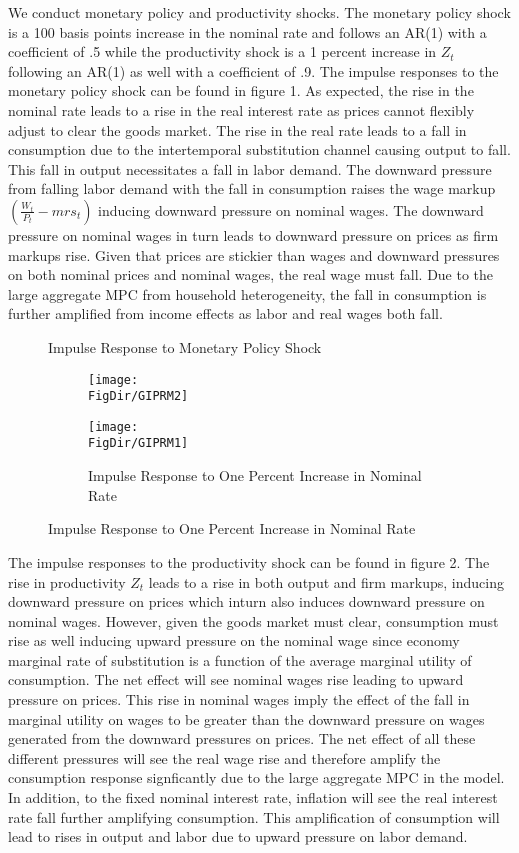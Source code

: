 \documentclass[titlepage]{\econtex}\providecommand{\texname}{BufferStockTheory}
\providecommand{\FigDir}{Figures}
\begin{document}
We conduct monetary policy and productivity shocks. The monetary policy shock is a 100 basis points increase in the nominal rate and follows an AR(1) with a coefficient of .5 while the productivity shock is a 1 percent increase in $Z_{t}$ following an AR(1) as well with a coefficient of .9. The impulse responses to the monetary policy shock can be found in figure 1.  As expected, the rise in the nominal rate leads to a rise in the real interest rate as prices cannot flexibly adjust to clear the goods market. The rise in the real rate leads to a fall in consumption due to the intertemporal substitution channel  causing output to fall. This fall in output necessitates a fall in labor demand. The downward pressure from falling labor demand with the fall in consumption raises the wage markup $(\frac{W_{t}}{P_{t}} - mrs_{t})$ inducing downward pressure on nominal wages. The downward pressure on nominal wages in turn leads to downward pressure on prices as firm markups rise. Given that prices are stickier than wages and downward pressures on both nominal prices and nominal wages, the real wage must fall. Due to the large aggregate MPC from household heterogeneity, the fall in consumption is further amplified from income effects as labor and real wages both fall. 


\begin{figure}{Impulse Response to Monetary Policy Shock}
  \begin{subfigure}{}
    \centering\texttt{[image: \\FigDir/GIPRM2]}
  \end{subfigure}
  \begin{subfigure}{}
    \centering\texttt{[image: \\FigDir/GIPRM1]}
    \caption{ Impulse Response to One Percent Increase in Nominal Rate}
  \end{subfigure}
\end{figure}

The impulse responses to the productivity shock can be found in figure 2. The rise in productivity $Z_{t}$ leads to a rise in both output and firm markups, inducing downward pressure on prices which inturn also induces downward pressure on nominal wages. However, given the goods market must clear, consumption must rise as well inducing upward pressure on the nominal wage since economy marginal rate of substitution is a function of the average marginal utility of consumption. The net effect will see nominal wages rise leading to upward pressure on prices. This rise in nominal wages imply the effect of the fall in marginal utility on wages to be greater than the downward pressure on wages generated from the downward pressures on prices. The net effect of all these different pressures will see the real wage rise and therefore amplify the consumption response signficantly due to the large aggregate MPC in the model. In addition, to the fixed nominal interest rate, inflation will see the real interest rate fall further amplifying consumption. This amplification of consumption will lead to rises in output and labor due to upward pressure on labor demand.
\end{document}
